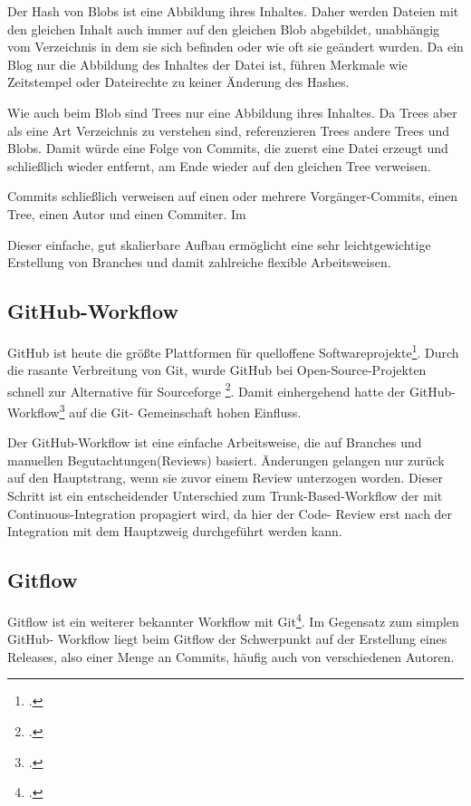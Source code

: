 Der Hash von Blobs ist eine Abbildung ihres Inhaltes. Daher werden Dateien mit den gleichen Inhalt auch immer auf den 
gleichen Blob abgebildet, unabhängig vom Verzeichnis in dem sie sich befinden oder wie oft sie geändert wurden. Da ein 
Blog nur die Abbildung des Inhaltes der Datei ist, führen Merkmale wie Zeitstempel oder Dateirechte zu keiner Änderung 
des Hashes.

Wie auch beim Blob sind Trees nur eine Abbildung ihres Inhaltes. Da Trees aber als eine Art Verzeichnis zu verstehen 
sind, referenzieren Trees andere Trees und Blobs. Damit würde eine Folge von Commits, die zuerst eine Datei erzeugt und 
schließlich wieder entfernt, am Ende wieder auf den gleichen Tree verweisen.

Commits schließlich verweisen auf einen oder mehrere Vorgänger-Commits, einen Tree, einen Autor und einen Commiter. Im 

Dieser einfache, gut skalierbare Aufbau ermöglicht eine sehr leichtgewichtige Erstellung von Branches und damit 
zahlreiche flexible Arbeitsweisen.

\subsection{GitHub-Workflow}

GitHub ist heute die größte Plattformen für quelloffene Softwareprojekte\footcite{github-marketshare-datanyze}. Durch die 
rasante Verbreitung von Git, wurde GitHub bei Open-Source-Projekten schnell zur Alternative für Sourceforge
\footcite{heise-github-2011}. Damit einhergehend hatte der GitHub-Workflow\footcite{github-workflow-intro} auf die Git-
Gemeinschaft hohen Einfluss.

Der GitHub-Workflow ist eine einfache Arbeitsweise, die auf Branches und manuellen Begutachtungen(Reviews) basiert. 
Änderungen gelangen nur zurück auf den Hauptstrang, wenn sie zuvor einem Review unterzogen worden. Dieser Schritt ist ein 
entscheidender Unterschied zum Trunk-Based-Workflow der mit Continuous-Integration propagiert wird, da hier der Code-
Review erst nach der Integration mit dem Hauptzweig durchgeführt werden kann.

\subsection{Gitflow}

Gitflow ist ein weiterer bekannter Workflow mit Git\footcite{nvie-git-branch-model}. Im Gegensatz zum simplen GitHub-
Workflow liegt beim Gitflow der Schwerpunkt auf der Erstellung eines Releases, also einer Menge an Commits, häufig auch 
von verschiedenen Autoren.

